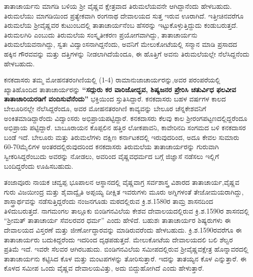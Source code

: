 \newpage

ತಾತಾಚಾರ್ಯನು ಮಾಗಡಿ ಬಳಿಯ ಶ‍್ರೀ ವೈಷ್ಣವ ಕ್ಷೇತ್ರವಾದ ತಿರುಮಲೆಯವನೇ ಆಗಿದ್ದಾನೆಂದು ಹೇಳಬಹುದು. ತಿರುಮಲೆಯು ಮಾಗಡಿಯಿಂದ ಪ್ರತ್ಯೇಕವಾಗಿ ರಂಗನಾಥ ದೇವಾಲಯದ ಸುತ್ತ ಇರುವ ಊರಾಗಿದೆ. ಇತ್ತೀಚಿನವರೆಗೂ ತಿರುಮಲೆಯ ಶ‍್ರೀವೈಷ್ಣವರ ಕುಟುಂಬದಲ್ಲಿ ತಾತಾಚಾರ್ಯನೆಂಬ ಹೆಸರನ್ನು ಇಟ್ಟುಕೊಳ್ಳು\-ತ್ತಿದ್ದುದು ಕಂಡುಬರುತ್ತದೆ. ತಿರುಮಲಗಿರಿ ಎಂಬುದು ತಿರುಮಲೆಯ ಸಂಸ್ಕೃತೀಕರಣ ಪ್ರಯೋಗವಾಗಿದ್ದು, ತಾತಾಚಾರ್ಯನು ತಿರುಮಲೆಯವನಾಗಿದ್ದು, ಸ್ವತಃ ವಿದ್ವಾಂಸನಾಗಿದ್ದನೆಂದು, ಅವನಿಗೆ ಮೇಲುಕೋಟೆಯಲ್ಲಿ ಸನ್ಮಾನ ಮಾಡಿ ಪ್ರಸಾದದ ಹಕ್ಕಿನ ಗೌರವವನ್ನು ಮತ್ತು ದತ್ತಿಗಳನ್ನು ನೀಡಲಾಗಿದೆಯೆಂದೂ, ಈ ಹೊತ್ತಿಗೆ ಅವನು ತಿರುಮಲೆಯಲ್ಲೇ ನೆಲೆಸಿದ್ದನೆಂದು ಹೇಳಬಹುದು.

ಕನಕದಾಸರು ತಮ್ಮ ಮೋಹನತರಂಗಿಣಿಯಲ್ಲಿ (1-4) ರಾಮಾನುಜಾಚಾರ್ಯರನ್ನು,ಅವರ ಪರಂಪರೆಯಲ್ಲಿ ಖ್ಯಾತಿ\-ಹೊಂದಿದ ತಾತಾಚಾರ್ಯರನ್ನು \textbf{“ಸದ್ಗುರು ಕರ ವಾರಿಜೋದ್ಭವ, ಶಿಷ್ಯಜನರ ಪ್ರೇರಿಸಿ ಚತುರ್ವಿಧ ಫಲವೀವ ತಾತಾಚಾರಿಯರಡಿಗೆ ವಂದಿಸುವೆನೆಂದು”} ಭಕ್ತಿಯಿಂದ ಸ್ತುತಿಸಿದ್ದಾರೆ. ಕನಕದಾಸರು ಬಹಳ ವರ್ಷಗಳ ಕಾಲದ ಬೇಲೂರಿನಲ್ಲೇ ನೆಲೆಸಿದ್ದರೆಂದೂ, ಅವರ ಮೋಹನತರಂಗಿಣಿ ಕಾವ್ಯವನ್ನು ಬೇಲೂರ ಚೆನ್ನಕೇಶವನಿಗೆ ಅಂಕಿತಮಾಡಿದ್ದಾರೆಂದು ವಿದ್ವಾಂಸರು ಅಭಿಪ್ರಾಯಪಟ್ಟಿದ್ದಾರೆ. ಕನಕದಾಸರು ಕೆಲವು ಕಾಲ ಶ‍್ರೀರಂಗಪಟ್ಟಣದಲ್ಲಿದ್ದರೆಂದೂ ಅಭಿಪ್ರಾಯ ಪಟ್ಟಿದ್ದಾರೆ. ಬಾಬೂರಾಯನ ಕೊಪ್ಪಲಿನ ಹತ್ತಿರ ಲೋಕಪಾವನಿ, ಕಾವೇರಿನದಿ ಸಂಗಮದ ಬಳಿ ಕನಕದಾಸರ ಬಂಡೆ ಇದೆ. ಬೇಲೂರು ಮತ್ತು ತಿರುಮಲೆಗಳು ದಕ್ಷಿಣ ಕರ್ನಾಟಕದಲ್ಲಿ ಇರುವುದರಿಂದ, ಅದೂ ಕೇವಲ ಸುಮಾರು 60-70ಮೈಲಿಗಳ ಅಂತರದಲ್ಲಿರುವುದರಿಂದ ಕನಕದಾಸರು ತಿರುಮಲೆಯ ತಾತಾಚಾರ್ಯರನ್ನು ಗುರುವಾಗಿ ಸ್ವೀಕರಿಸಿದ್ದರೆಂಬುದು ಅವರನ್ನು ನೋಡಲು, ಅವರಿಂದ ವೈಷ್ಣವಧರ್ಮದ ಬಗ್ಗೆ ಜಿಜ್ಞಾಸೆ ನಡೆಸಲು ಇಲ್ಲಿಗೆ ಬಂದಿದ್ದರೆಂದು ಊಹಿಸಬಹುದು.

ತಂಜಾವೂರು ನಾಯಕ ಚವ್ವಪ್ಪ ಭೂಪಾಲನ ಆಸ್ಥಾನದಲ್ಲಿ ವೈಷ್ಣವಾಗ್ರ ಸರ್ವಶಾಸ್ತ್ರ ವಿಶಾರದ ತಾತಾಚಾರ್ಯ,\break ವೈಷ್ಣವ ಗುರು ವಿಜಯೀಂದ್ರ ಮತ್ತು ಶೈವಾದ್ವೈತಿ ಅಪ್ಪಯ್ಯ ದೀಕ್ಷಿತ ಇವರುಗಳು ಮೂರು ಅಗ್ನಿಗಳಂತೆ ತೇಜೋಮಯ\-ರಾಗಿದ್ದು, ಶಾಸ್ತ್ರಾರ್ಥವನ್ನು ನಡೆಸುತ್ತಿದ್ದರೆಂದು ನಂಜನಗೂಡು ಮಠದಲ್ಲಿರುವ ಕ್ರಿ.ಶ.1580ರ ತಾಮ್ರ ಶಾಸನದಿಂದ ತಿಳಿದು\-ಬರುತ್ತದೆ. ನಾಗಮಂಗಲ ತಾಲ್ಲೂಕು ಬಿಂಡಿಗನವಿಲೆಯ ಕೇಶವ ದೇವಾಲಯದಲ್ಲಿರುವ ಕ್ರಿ.ಶ.1590ರ ಶಾಸನದಲ್ಲಿ “ಶ‍್ರೀಮತ್​ ತಾತಾಚಾರ್ಯ ಸೆವಲರವರ ಧರ್ಮ” ಎಂದು ಹೇಳಿದೆ. ಬಹುಶಃ ತಾತಾಚಾರ್ಯರ ಶಿಷ್ಯರುಗಳು ಈ ದೇವಾಲಯದ ವಿಸ್ತರಣೆ ಮತ್ತು ಜೀರ್ಣೋದ್ಧಾರವನ್ನು ಮಾಡಿರುವರೆಂದು ಹೇಳಬಹುದು. ಕ್ರಿ.ಶ.1590ರವರೆಗೂ ಈ ತಾತಾಚಾರ್ಯರು ಬದುಕಿದ್ದರೆಂದು ಇದರಿಂದ ದೃಢಪಡುತ್ತದೆ. ಮೇಲುಕೋಟೆಯ ದೇವಾಲಯದಲಿ ಬಲಿ ಶೆಲ್ವರ ಪ್ರತಿಮೆ ಇದೆ. ಇವರೇ ಸೆಲವರ ಆಗಿರಬಹುದು. ಬಿಂಡಿಗನವಿಲೆಯ ಸಮೀಪದಲ್ಲಿರುವ ಶ‍್ರೀವೈಷ್ಣವಕ್ಷೇತ್ರ ಹೊನ್ನಾವರದಲ್ಲಿ ತಾತಾಚಾರ್ಯನು ಕಟ್ಟಿಸಿದ ಕೊಳ ಮತ್ತು ಮಂಟಪಗಳನ್ನು ತೋರಿಸುತ್ತಾರೆ. ಇದನ್ನು ತಾತಯ್ಯನ ಕೊಳ ಎನ್ನುತ್ತಾರೆ. ಈ ಕೊಳದ ಸಮೀಪ ಒಂದು ವೈಷ್ಣವ ದೇವಾಲಯವಿತ್ತು, ಅದು ಬಿದ್ದುಹೋಗಿದೆ ಎಂದು ಹೇಳುತ್ತಾರೆ.

